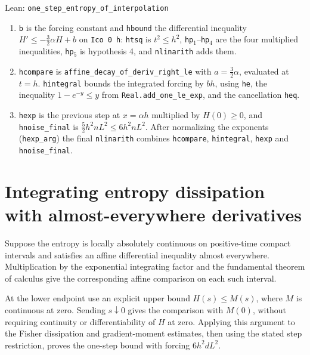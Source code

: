 \documentclass[11pt,a4paper]{report}
\begin{document}
\begin{leanbox}{Lean: \texttt{one\_\allowbreak{}step\_\allowbreak{}entropy\_\allowbreak{}of\_\allowbreak{}interpolation}}
\begin{enumerate}
\item \texttt{b} is the forcing constant and \texttt{hbound} the differential inequality \(H'\le-\frac32\alpha H+b\) on \texttt{Ico 0 h}: \texttt{htsq} is \(t^2\le h^2\), \texttt{hp\ensuremath{{}_{1}}}–\texttt{hp\ensuremath{{}_{4}}} are the four multiplied inequalities, \texttt{hp\ensuremath{{}_{5}}} is hypothesis 4, and \texttt{nlinarith} adds them.

\item \texttt{hcompare} is \texttt{affine\_\allowbreak{}decay\_\allowbreak{}of\_\allowbreak{}deriv\_\allowbreak{}right\_\allowbreak{}le} with \(a=\frac32\alpha\), evaluated at \(t=h\). \texttt{hintegral} bounds the integrated forcing by \(bh\), using \texttt{he}, the inequality \(1-e^{-y}\le y\) from \texttt{Real.\allowbreak{}add\_\allowbreak{}one\_\allowbreak{}le\_\allowbreak{}exp}, and the cancellation \texttt{heq}.

\item \texttt{hexp} is the previous step at \(x=\alpha h\) multiplied by \(H(0)\ge0\), and \texttt{hnoise\_\allowbreak{}final} is \(\frac52h^2nL^2\le6h^2nL^2\). After normalizing the exponents (\texttt{hexp\_\allowbreak{}arg}) the final \texttt{nlinarith} combines \texttt{hcompare}, \texttt{hintegral}, \texttt{hexp} and \texttt{hnoise\_\allowbreak{}final}.

\end{enumerate}
\end{leanbox}
\section{\texorpdfstring{Integrating entropy dissipation with almost-everywhere derivatives}{Integrating entropy dissipation with almost-everywhere derivatives}}
\label{proof-module-UnadjustedLangevin-LSI-IntegratedEntropy-lean}


Suppose the entropy is locally absolutely continuous on positive-time compact intervals and satisfies an affine differential inequality almost everywhere. Multiplication by the exponential integrating factor and the fundamental theorem of calculus give the corresponding affine comparison on each such interval.



At the lower endpoint use an explicit upper bound \(H(s)\le M(s)\), where \(M\) is continuous at zero. Sending \(s\downarrow0\) gives the comparison with \(M(0)\), without requiring continuity or differentiability of \(H\) at zero. Applying this argument to the Fisher dissipation and gradient-moment estimates, then using the stated step restriction, proves the one-step bound with forcing \(6h^2dL^2\).
\end{document}
